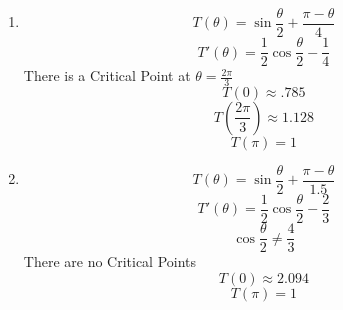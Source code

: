 \documentclass{article}
\begin{document}
\begin{enumerate}
        \begin{enumerate}
            \item
            $$T(\theta) = \sin{\frac{\theta}{2}} + \frac{\pi - \theta}{4}$$
            $$T'(\theta) = \frac{1}{2}\cos{\frac{\theta}{2}} - \frac{1}{4}$$
            There is a Critical Point at $\theta = \frac{2\pi}{3}$
            $$T(0) \approx .785$$
            $$T\left(\frac{2\pi}{3}\right) \approx 1.128$$
            $$T(\pi) = 1$$
            \item
            $$T(\theta) = \sin{\frac{\theta}{2}} + \frac{\pi - \theta}{1.5}$$
            $$T'(\theta) = \frac{1}{2}\cos{\frac{\theta}{2}} - \frac{2}{3}$$
            $$\cos{\frac{\theta}{2}} \neq \frac{4}{3}$$
            There are no Critical Points
            $$T(0) \approx 2.094$$
            $$T(\pi) = 1$$
        \end{enumerate}
\end{enumerate}
\end{document}
